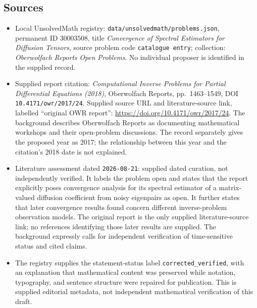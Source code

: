 \documentclass[11pt]{article}
\begin{document}
\subsection{Sources}
\begin{itemize}
\item Local UnsolvedMath registry: \texttt{data/unsolvedmath/problems.json}, permanent ID \(30003508\), title \emph{Convergence of Spectral Estimators for Diffusion Tensors}, source problem code \texttt{catalogue entry}; collection: \emph{Oberwolfach Reports Open Problems}. No individual proposer is identified in the supplied record.
\item Supplied report citation: \emph{Computational Inverse Problems for Partial Differential Equations (2018)}, Oberwolfach Reports, pp.\ 1463--1549, DOI \texttt{10.4171/owr/2017/24}. Supplied source URL and literature-source link, labelled ``original OWR report'': \url{https://doi.org/10.4171/owr/2017/24}. The background describes Oberwolfach Reports as documenting mathematical workshops and their open-problem discussions. The record separately gives the proposed year as 2017; the relationship between this year and the citation's 2018 date is not explained.
\item Literature assessment dated \texttt{2026-08-21}: supplied dated curation, not independently verified. It labels the problem open and states that the report explicitly poses convergence analysis for its spectral estimator of a matrix-valued diffusion coefficient from noisy eigenpairs as open. It further states that later convergence results found concern different inverse-problem observation models. The original report is the only supplied literature-source link; no references identifying those later results are supplied. The background expressly calls for independent verification of time-sensitive status and cited claims.
\item The registry supplies the statement-status label \texttt{corrected\_verified}, with an explanation that mathematical content was preserved while notation, typography, and sentence structure were repaired for publication. This is supplied editorial metadata, not independent mathematical verification of this draft.
\end{itemize}
\end{document}
